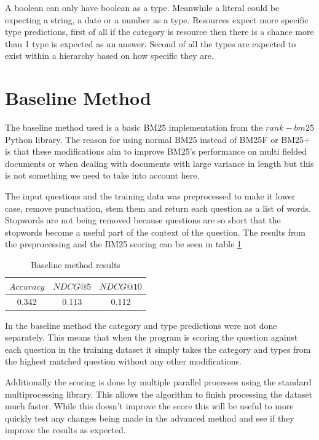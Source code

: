 \documentclass[sigconf]{acmart}
\begin{document}
A boolean can only have boolean as a type. Meanwhile a literal could be expecting a string, a date or a number as a type. Resources expect more specific type predictions, first of all if the category is resource then there is a chance more than 1 type is expected as an answer. Second of all the types are expected to exist within a hierarchy based on how specific they are.



\section{Baseline Method}
The baseline method used is a basic BM25 implementation from the $rank-bm25$ Python library. The reason for using normal BM25 instead of BM25F or BM25+ is that these modifications aim to improve BM25's performance on multi fielded documents or when dealing with documents with large variance in length but this is not something we need to take into account here.

The input questions and the training data was preprocessed to make it lower case, remove punctuation, stem them and return each question as a list of words. Stopwords are not being removed because questions are so short that the stopwords become a useful part of the context of the question. The results from the preprocessing and the BM25 scoring can be seen in table \ref{tab:baseline_res}

\begin{table}[h]
    \centering
    \caption{Baseline method results}
    \begin{tabular}{c|c|c}
    $Accuracy$ & $NDCG@5$ & $NDCG@10$ \\
    \hline
    0.342 & 0.113 & 0.112
    \end{tabular}
    \label{tab:baseline_res}
\end{table}

In the baseline method the category and type predictions were not done separately. This means that when the program is scoring the question against each question in the training dataset it simply takes the category and types from the highest matched question without any other modifications.

Additionally the scoring is done by multiple parallel processes using the standard multiprocessing library. This allows the algorithm to finish processing the dataset much faster. While this doesn't improve the score this will be useful to more quickly test any changes being made in the advanced method and see if they improve the results as expected.
\end{document}
